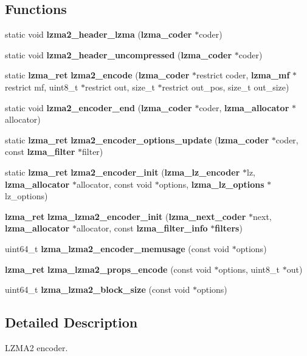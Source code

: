 \subsection*{Functions}
\begin{DoxyCompactItemize}
\item 
static void {\bfseries lzma2\-\_\-header\-\_\-lzma} ({\bf lzma\-\_\-coder} $\ast$coder)\label{lzma2__encoder_8c_aebd899338221cb373f1dc9ac826db162}

\item 
static void {\bfseries lzma2\-\_\-header\-\_\-uncompressed} ({\bf lzma\-\_\-coder} $\ast$coder)\label{lzma2__encoder_8c_aeb5df1ce96b52209facc3bb3848ea909}

\item 
static {\bf lzma\-\_\-ret} {\bfseries lzma2\-\_\-encode} ({\bf lzma\-\_\-coder} $\ast$restrict coder, {\bf lzma\-\_\-mf} $\ast$restrict mf, uint8\-\_\-t $\ast$restrict out, size\-\_\-t $\ast$restrict out\-\_\-pos, size\-\_\-t out\-\_\-size)\label{lzma2__encoder_8c_ab97c5449b5d8a758530e704709b4d1a0}

\item 
static void {\bfseries lzma2\-\_\-encoder\-\_\-end} ({\bf lzma\-\_\-coder} $\ast$coder, {\bf lzma\-\_\-allocator} $\ast$allocator)\label{lzma2__encoder_8c_a70a1ecf08b02d451e3939daa2f9d42fd}

\item 
static {\bf lzma\-\_\-ret} {\bfseries lzma2\-\_\-encoder\-\_\-options\-\_\-update} ({\bf lzma\-\_\-coder} $\ast$coder, const {\bf lzma\-\_\-filter} $\ast$filter)\label{lzma2__encoder_8c_a0502ccb5353178491cde602772d1bbd8}

\item 
static {\bf lzma\-\_\-ret} {\bfseries lzma2\-\_\-encoder\-\_\-init} ({\bf lzma\-\_\-lz\-\_\-encoder} $\ast$lz, {\bf lzma\-\_\-allocator} $\ast$allocator, const void $\ast$options, {\bf lzma\-\_\-lz\-\_\-options} $\ast$lz\-\_\-options)\label{lzma2__encoder_8c_a0fd77b7c2837cfe0af7ff9cb2f29eb42}

\item 
{\bf lzma\-\_\-ret} {\bfseries lzma\-\_\-lzma2\-\_\-encoder\-\_\-init} ({\bf lzma\-\_\-next\-\_\-coder} $\ast$next, {\bf lzma\-\_\-allocator} $\ast$allocator, const {\bf lzma\-\_\-filter\-\_\-info} $\ast${\bf filters})\label{lzma2__encoder_8c_afb56adb52d38d5bd3b655056b913d915}

\item 
uint64\-\_\-t {\bfseries lzma\-\_\-lzma2\-\_\-encoder\-\_\-memusage} (const void $\ast$options)\label{lzma2__encoder_8c_afff5740f7004ed7d3c7b67c3671a30c0}

\item 
{\bf lzma\-\_\-ret} {\bfseries lzma\-\_\-lzma2\-\_\-props\-\_\-encode} (const void $\ast$options, uint8\-\_\-t $\ast$out)\label{lzma2__encoder_8c_aecbff0af1269d11accb87f956e2609d4}

\item 
uint64\-\_\-t {\bfseries lzma\-\_\-lzma2\-\_\-block\-\_\-size} (const void $\ast$options)\label{lzma2__encoder_8c_ae1c48f80b363367e094795c60f466624}

\end{DoxyCompactItemize}


\subsection{Detailed Description}
L\-Z\-M\-A2 encoder. 